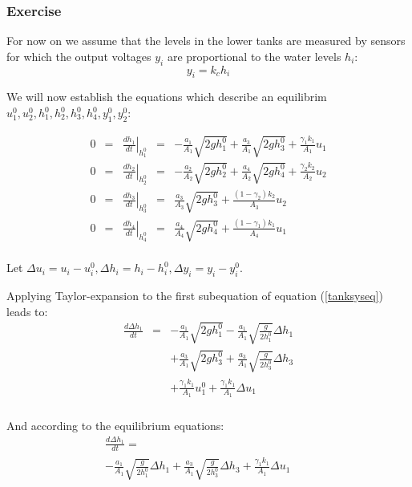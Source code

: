 \subsubsection{Exercise} 

For now on we assume that the levels in the lower tanks are measured by sensors for which the output voltages $y_i$ are proportional to the water levels $h_i$:
$$
y_i = k_c h_i
$$

We will now establish the equations which describe an equilibrim $u_1^0,u_2^0,h_1^0,h_2^0,h_3^0,h_4^0,y_1^0,y_2^0$:

$$
        \begin{array}{rcccl}
    0 & = & \left.\frac{dh_1}{dt}\right|_{h_1^0} & = &
            - \frac{a_1}{A_1}\sqrt{2gh_1^0} + \frac{a_3}{A_1}\sqrt{2gh_3^0} + \frac{\gamma_1k_1}{A_1}u_1\\ 

    0 & = & \left.\frac{dh_2}{dt}\right|_{h_2^0} & = &
            - \frac{a_2}{A_2}\sqrt{2gh_2^0} + \frac{a_4}{A_2}\sqrt{2gh_4^0} + \frac{\gamma_2k_2}{A_2}u_2\\ 

    0 & = & \left.\frac{dh_3}{dt}\right|_{h_3^0} & = &
            \frac{a_3}{A_3}\sqrt{2gh_3^0}+\frac{(1-\gamma_2)k_2}{A_3}u_2 \\ 

    0 & = & \left.\frac{dh_4}{dt}\right|_{h_4^0} & = &
            \frac{a_4}{A_4}\sqrt{2gh_4^0}+\frac{(1-\gamma_1)k_1}{A_4}u_1 \\ 
        \end{array}
$$

Let $\Delta u_i = u_i - u_i^0, \Delta h_i = h_i - h_i^0, \Delta y_i = y_i - y_i^0$.

Applying Taylor-expansion to the first subequation of equation (\ref{tanksyseq}) leads to:
$$
\begin{array}{rcl}
    \frac{d\Delta h_1}{dt} & = &  
    - \frac{a_1}{A_1}\sqrt{2gh_1^0} - \frac{a_1}{A_1}\sqrt{\frac{g}{2h_1^0}}\Delta h_1 \\ 
    & & 
    + \frac{a_3}{A_1}\sqrt{2gh_3^0} + \frac{a_3}{A_1}\sqrt{\frac{g}{2h_3^0}}\Delta h_3 \\ 
    & & 
    + \frac{\gamma_1k_1}{A_1}u_1^0 + \frac{\gamma_1k_1}{A_1}\Delta u_1 \phantom{\sqrt{\frac{h^0}{2}}} \\ 
\end{array}
$$

And according to the equilibrium equations:
\begin{multline*}
    \frac{d\Delta h_1}{dt} =  \\
    - \frac{a_1}{A_1}\sqrt{\frac{g}{2h_1^0}}\Delta h_1
    + \frac{a_3}{A_1}\sqrt{\frac{g}{2h_3^0}}\Delta h_3
    + \frac{\gamma_1k_1}{A_1}\Delta u_1 \phantom{\sqrt{\frac{h^0}{2}}}
\end{multline*}

